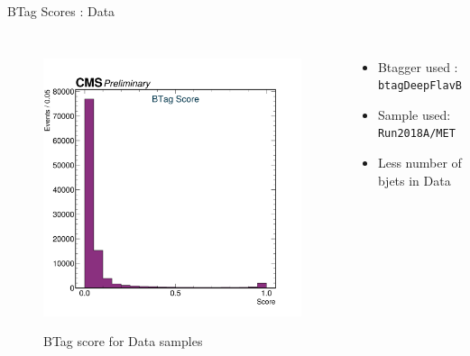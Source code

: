 \documentclass[10pt,xcolor=dvipsnames]{beamer}
\begin{document}
    
   \begin{frame}[fragile]{BTag Scores : Data} 
    \begin{columns}
    \begin{figure} 
    \centering 
     \includegraphics[width=1\textwidth]{../Archive/KinemPlots/TagData.png }
    \label{TagData} 
    \caption{BTag score for Data samples}
    \end{figure} 
    \begin{itemize} 
    \raggedright 
    \small
    \item {Btagger used : \texttt{btagDeepFlavB}} 
    \item {Sample used: \texttt{Run2018A/MET}} 
    \item Less number of bjets in Data
    \end{itemize}
    \end{columns} 
    \end{frame} 
    
\end{document}
